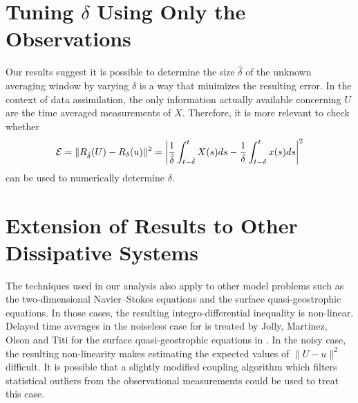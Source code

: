 \documentclass[master,tocprelim,12pt]{unrthesis}
\theoremstyle{definition}
\numberwithin{equation}{chapter}
\begin{document}
\begin{manuscript}
\section{Tuning $\delta$ Using Only the Observations}

Our results suggest it is possible to determine the size 
$\hat\delta$ of the unknown averaging window by 
varying $\delta$ is a way that minimizes the resulting error.
In the context of data assimilation, the only 
information actually available concerning $U$ are the time 
averaged measurements of $X$.  Therefore, it is
more relevant to check whether
$$
	{\cal E}=\|R_{\hat\delta}(U)-R_\delta(u)\|^2
        =\bigg|{1\over\hat\delta}\int_{t-\hat\delta}^t X(s)ds
        -{1\over\delta}\int_{t-\delta}^t x(s)ds\bigg|^2
$$
can be used to numerically determine $\delta$.  

\section{Extension of Results to Other Dissipative Systems}

The techniques used in our analysis also apply to other model
problems such as the two-dimensional Navier--Stokes equations and
the surface quasi-geostrophic equations.
In those cases, the resulting integro-differential inequality is 
non-linear.
Delayed time averages in the noiseless case for 
is treated by Jolly, Martinez, Olson and Titi for the surface 
quasi-geostrophic equations in \cite{Jolly16}.
In the noisy case, the resulting non-linearity makes estimating 
the expected values of $\|U-u\|^2$ difficult.
It is possible that a slightly modified coupling algorithm which
filters statistical outliers from the observational measurements 
could be used to treat this case.


\end{manuscript}
\end{document}
